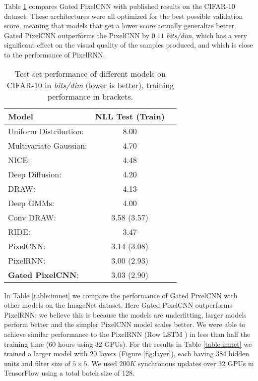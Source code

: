 \documentclass{article}
\begin{document}
Table \ref{table:cifar10} compares Gated PixelCNN with published results on the CIFAR-10 dataset. These architectures were all optimized for the best possible validation score, meaning that models that get a lower score actually generalize better. Gated PixelCNN outperforms the PixelCNN by $0.11$ \emph{bits/dim}, which has a very significant effect on the visual quality of the samples produced, and which is close to the performance of PixelRNN.
\begin{table}[h]
\centering
  \begin{tabular}{lcc}
    \toprule
    \textbf{Model} & \textbf{NLL Test (Train)}  \\ 
    \midrule
    Uniform Distribution: \cite{van2016pixel} & 8.00 \\ 
    Multivariate Gaussian: \cite{van2016pixel} & 4.70 \\ 
    NICE: \cite{dinh2014nice} & 4.48 \\ 
    Deep Diffusion: \cite{deepdiffusion} & 4.20 \\ 
    DRAW: \cite{gregor2015draw} & 4.13 \\
    Deep GMMs: \cite{van2014factoring,7028865} & 4.00 \\
    Conv DRAW: \cite{conceptcompression} & 3.58 (3.57) \\
    RIDE: \cite{theis2015generative,van2016pixel} & 3.47 \\ 
    PixelCNN: \cite{van2016pixel} & 3.14 (3.08) \\ 
    PixelRNN: \cite{van2016pixel} \quad\quad\quad\quad\quad\quad\quad & 3.00 (2.93) \\ 
    \midrule
    \textbf{Gated PixelCNN}: & 3.03 (2.90) \\
      \bottomrule
  \end{tabular}
\vspace{5pt}
\caption{Test set performance of different models on CIFAR-10 in \emph{bits/dim} (lower is better), training performance in brackets.}
\label{table:cifar10}
\end{table}

In Table \ref{table:imnet} we compare the performance of Gated PixelCNN with other models on the ImageNet dataset. Here Gated PixelCNN outperforms PixelRNN; we believe this is because the models are underfitting, larger models perform better and the simpler PixelCNN model scales better. We were able to achieve similar performance to the PixelRNN (Row LSTM \cite{van2016pixel}) in less than half the training time (60 hours using 32 GPUs). 
For the results in Table \ref{table:imnet} we trained a larger model with 20 layers (Figure \ref{fig:layer}), each having 384 hidden units and filter size of $5 \times 5$. We used $200K$ synchronous updates over 32 GPUs in TensorFlow \cite{abadi2016tensorflow} using a total batch size of 128.
\end{document}
